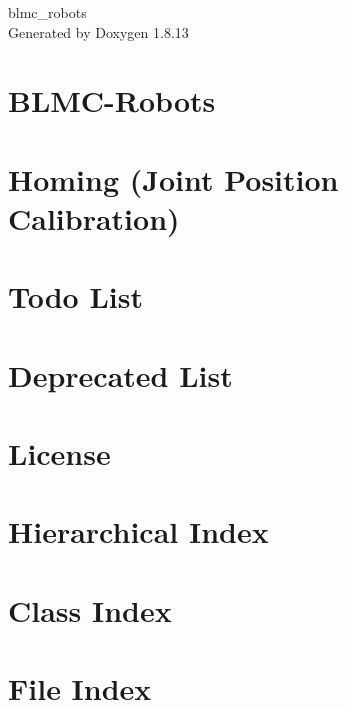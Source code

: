 \documentclass[twoside]{book}
\newcommand{\+}{\discretionary{\mbox{\scriptsize$\hookleftarrow$}}{}{}}
\newcommand{\clearemptydoublepage}{%
  \newpage{\pagestyle{empty}\cleardoublepage}%
}
\begin{document}
\hypersetup{pageanchor=false,
             bookmarksnumbered=true,
             pdfencoding=unicode
            }
\begin{titlepage}
\vspace*{7cm}
\begin{center}%
{\Large blmc\+\_\+robots }\\
\vspace*{1cm}
{\large Generated by Doxygen 1.8.13}\\
\end{center}
\end{titlepage}
\clearemptydoublepage
{}
\tableofcontents
\clearemptydoublepage
{}
\hypersetup{pageanchor=true}

\chapter{B\+L\+M\+C-\/\+Robots}
\label{index}\hypertarget{index}{}
\chapter{Homing (Joint Position Calibration)}
\label{homing}

\chapter{Todo List}
\label{todo}

\chapter{Deprecated List}
\label{deprecated}

\chapter{License}
\label{license}

\chapter{Hierarchical Index}

\chapter{Class Index}

\chapter{File Index}

\end{document}
